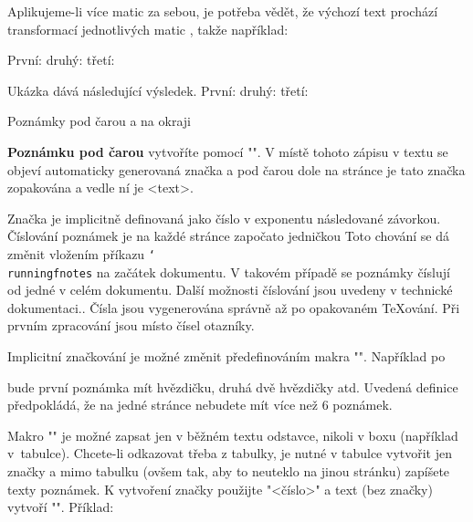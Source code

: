 Aplikujeme-li více matic za sebou, je potřeba vědět, že výchozí text
prochází transformací jednotlivých matic , takže
například:

\begtt
První: \pdfsave {}\pdfrestore
druhý: \pdfsave {}\pdfrestore
třetí: \pdfsave {}%
       \pdfrestore %
\endtt

\bigskip
Ukázka dává následující výsledek. První: 
  \pdfsave {}\pdfrestore
druhý:
  \pdfsave {}\pdfrestore
třetí: 
  \pdfsave {}%
       \pdfrestore 
\bigskip\bigskip


\sec Poznámky pod čarou a na okraji

{\bf Poznámku pod čarou} 
vytvoříte pomocí "". V místě tohoto zápisu
v textu se objeví automaticky generovaná značka a pod čarou dole na stránce
je tato značka zopakována a vedle ní je <text>. 

Značka je implicitně definovaná jako číslo v exponentu
následované závorkou. Číslování poznámek je na každé stránce započato
jedničkou\fnote
{Toto chování se dá změnit vložením příkazu {\tt\char`\\runningfnotes} na
začátek dokumentu. V takovém případě se poznámky číslují od jedné v celém
dokumentu. Další možnosti číslování jsou uvedeny v technické dokumentaci.}.
Čísla jsou vygenerována správně až po
opakovaném \TeX{}ování. Při prvním zpracování jsou místo čísel otazníky.

Implicitní značkování je možné změnit předefinováním makra "\thefnote".
Například po

\begtt
\def\thefnote{\ifcase\locfnum\or
   *\or**\or***\or$^{\dag}$\or$^{\ddag}$\or$^{\dag\dag}$\fi}
\endtt
%
bude první poznámka mít hvězdičku, druhá dvě hvězdičky atd. Uvedená
definice předpokládá, že na jedné stránce nebudete mít více než 6 poznámek.

Makro "\fnote" je možné zapsat jen v běžném textu odstavce, nikoli v boxu
(například v~tabulce). Chcete-li odkazovat třeba z tabulky, je nutné v
tabulce vytvořit jen značky a mimo tabulku (ovšem tak, aby to neuteklo na
jinou stránku) zapíšete texty poznámek. K vytvoření značky použijte
"\fnotemark<číslo>" a text (bez značky) vytvoří "".
Příklad:

